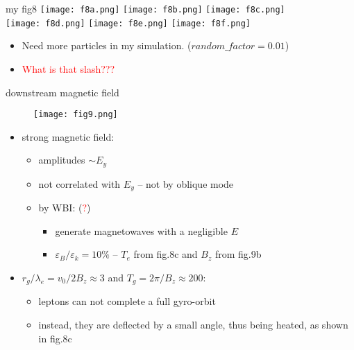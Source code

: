 \documentclass[10pt]{beamer}
\begin{document}
\begin{frame}{my fig8}
\texttt{[image: f8a.png]}
\texttt{[image: f8b.png]} 
\texttt{[image: f8c.png]} \\
\texttt{[image: f8d.png]} 
\texttt{[image: f8e.png]}
\texttt{[image: f8f.png]} \\

\begin{itemize}
\item Need more particles in my simulation. ($random\_factor = 0.01$)
\item \textcolor{red}{What is that slash???}
\end{itemize}
\end{frame}

\begin{frame}{downstream magnetic field}
\begin{figure}
\texttt{[image: fig9.png]}
\end{figure}

\begin{itemize}
\item \footnotesize strong magnetic field: 
\begin{itemize}
\item \footnotesize amplitudes $\sim E_y$
\item \footnotesize not correlated with $E_y$ -- not by oblique mode
\item \footnotesize by WBI:  (\textcolor{red}{?})
\begin{itemize}
\item \footnotesize generate magnetowaves with a negligible $E$
\item \footnotesize $\varepsilon_B/\varepsilon_k = 10\%$ -- $T_e$ from fig.8c and $B_z$ from fig.9b
\end{itemize}
\end{itemize}
\item \footnotesize $r_g/\lambda_e = v_0/2B_z \approx 3$ and $T_g = 2\pi/B_z \approx 200$:
\begin{itemize}
\item \footnotesize leptons can not complete a full gyro-orbit
\item \footnotesize instead, they are deflected by a small angle, thus being heated, as shown in fig.8c
\end{itemize}
\end{itemize}
\end{frame}
\end{document}
